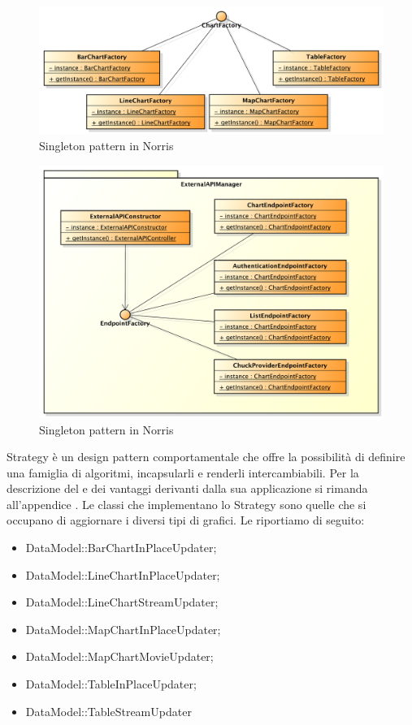 	    		\begin{figure}[H]\centering
	        		\includegraphics[width=\textwidth]{SpecificaTecnica/Pics/DesignPatternNorris/Singleton2}
	        		\caption{Singleton pattern in Norris}
	    		\end{figure}
	    		\begin{figure}[H]\centering
	        		\includegraphics[width=\textwidth]{SpecificaTecnica/Pics/DesignPatternNorris/Singleton3}
	        		\caption{Singleton pattern in Norris}
	    		\end{figure}
	    		
			Strategy è un design pattern comportamentale che offre la possibilità di definire una famiglia di
algoritmi, incapsularli e renderli intercambiabili. Per la descrizione del  e dei vantaggi derivanti dalla sua applicazione si rimanda all'appendice .
					Le classi che implementano lo Strategy sono quelle che si occupano di aggiornare i diversi tipi di grafici. Le riportiamo di seguito:
					\begin{itemize}
					\item DataModel::BarChartInPlaceUpdater;
					\item DataModel::LineChartInPlaceUpdater;
					\item DataModel::LineChartStreamUpdater;
					\item DataModel::MapChartInPlaceUpdater;
					\item DataModel::MapChartMovieUpdater;
					\item DataModel::TableInPlaceUpdater;
					\item DataModel::TableStreamUpdater
				\end{itemize}
		
